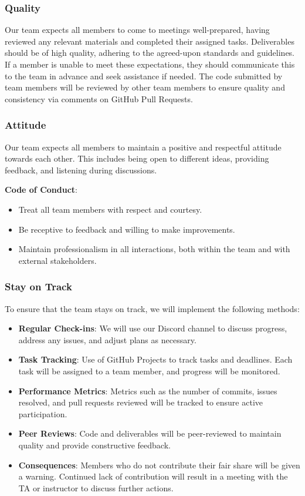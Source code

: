 \documentclass{article}
\begin{document}
\subsubsection*{Quality} 

Our team expects all members to come to meetings well-prepared, having reviewed any 
relevant materials and completed their assigned tasks. Deliverables should be of high 
quality, adhering to the agreed-upon standards and guidelines. If a member is unable 
to meet these expectations, they should communicate this to the team in advance and 
seek assistance if needed. The code submitted by team members will be reviewed by 
other team members to ensure quality and consistency via comments on GitHub Pull Requests.

\subsubsection*{Attitude}

Our team expects all members to maintain a positive and respectful attitude towards each other. 
This includes being open to different ideas, providing feedback, and  
listening during discussions.

\textbf{Code of Conduct}:
\begin{itemize}
    \item Treat all team members with respect and courtesy.
    \item Be receptive to feedback and willing to make improvements.
    \item Maintain professionalism in all interactions, both within the team and with external stakeholders.
\end{itemize}

\subsubsection*{Stay on Track}

To ensure that the team stays on track, we will implement the following methods:

\begin{itemize}
    \item \textbf{Regular Check-ins}: We will use our Discord channel to discuss progress, address any issues, and adjust plans as necessary.
    \item \textbf{Task Tracking}: Use of GitHub Projects to track tasks and deadlines. Each task will be assigned to a team member, and progress will be monitored.
    \item \textbf{Performance Metrics}: Metrics such as the number of commits, issues resolved, and pull requests reviewed will be tracked to ensure active participation.
    \item \textbf{Peer Reviews}: Code and deliverables will be peer-reviewed to maintain quality and provide constructive feedback.
    \item \textbf{Consequences}: Members who do not contribute their fair share will be given a warning. Continued lack of contribution will result in a meeting with the TA or instructor to discuss further actions.
\end{itemize}
\end{document}
